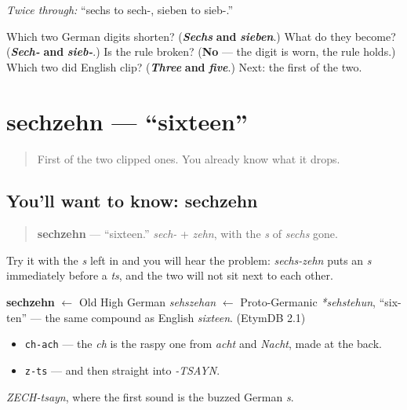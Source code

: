 \emph{Twice through:} \textquotedblleft{}sechs to sech-, sieben to sieb-.\textquotedblright{}

\begin{tcolorbox}[breakable,colback=teal!4,colframe=teal!35!black,title={Before you move on}]
Which two German digits shorten? (\emph{\textbf{Sechs}} \textbf{and} \emph{\textbf{sieben}}.) What do they become? (\emph{\textbf{Sech-}} \textbf{and} \emph{\textbf{sieb-}}.) Is the rule broken? (\textbf{No} — the digit is worn, the rule holds.) Which two did English clip? (\emph{\textbf{Three}} \textbf{and} \emph{\textbf{five}}.) Next: the first of the two.
\end{tcolorbox}
\section[sechzehn]{sechzehn — \textquotedblleft{}sixteen\textquotedblright{}}

\label{lesson:GE-C12-sechzehn}



\begin{quote}
First of the two clipped ones. You already know what it drops.
\end{quote}

\subsection*{You'll want to know: sechzehn}
\begin{quote}
\textbf{sechzehn} — \textquotedblleft{}sixteen.\textquotedblright{} \emph{sech-} + \emph{zehn}, with the \emph{s} of \emph{sechs} gone.
\end{quote}

Try it with the \emph{s} left in and you will hear the problem: \emph{sechs-zehn} puts an \emph{s} immediately before a \emph{ts}, and the two will not sit next to each other.

\begin{cousinweb}
\textbf{sechzehn} $\leftarrow$ Old High German \emph{sehszehan} $\leftarrow$ Proto-Germanic \emph{*sehstehun}, \textquotedblleft{}six-ten\textquotedblright{} — the same compound as English \emph{sixteen}. (EtymDB 2.1)
\end{cousinweb}

\begin{sounds}
\begin{itemize}
\raggedright
  \item \texttt{ch-ach} — the \emph{ch} is the raspy one from \emph{acht} and \emph{Nacht}, made at the back.
  \item \texttt{z-ts} — and then straight into \emph{-TSAYN}.
\end{itemize}

\emph{ZECH-tsayn}, where the first sound is the buzzed German \emph{s}.
\end{sounds}


